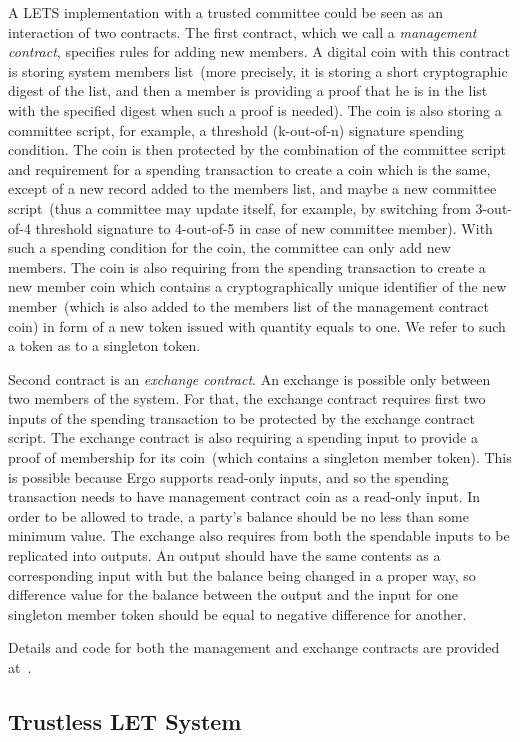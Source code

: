\documentclass[]{llncs}   %
\begin{document}
A LETS implementation with a trusted committee could be seen as an interaction of two contracts. The first contract, which we
call a {\em management contract}, specifies rules for adding new members. A digital coin with this contract is storing system members list~(more precisely, it is storing a short cryptographic digest of the list, and then a member is providing a proof that he is in the list with the specified digest when such a proof is needed). The coin is also storing a committee script, for example, a threshold (k-out-of-n) signature spending condition. The coin is then protected by the combination of the committee script and requirement for a 
spending transaction to create a coin which is the same, except of a new record added to the members list, and maybe a new committee script~(thus a committee may update itself, for example, by switching from 3-out-of-4 threshold signature to 4-out-of-5 in case of new committee member). With such a spending condition for the coin, the committee can only add new members. The coin is also requiring from the spending transaction to create a new member coin which contains a cryptographically unique identifier of the new member~(which is also added to the members list of the management contract coin) in form of a new token issued with quantity equals to one. We 
refer to such a token as to a singleton token.

Second contract is an {\em exchange contract}. An exchange is possible only between two members of the system. For that, the exchange 
contract requires first two inputs of the spending transaction to be protected by the exchange contract script. The exchange contract is also 
requiring a spending input to provide a proof of membership for its coin~(which contains a singleton member token). This is possible because Ergo supports read-only inputs, and so the spending transaction needs to have management contract coin as a read-only input. In order to be allowed to trade, a party's balance should be no less than some minimum value. The exchange also requires from both the spendable inputs to be replicated into outputs. An output should have the same contents as a corresponding input with but the balance being changed in a proper way, so difference value for the balance between the output and the input for one singleton member token should be equal to negative difference for another.

Details and code for both the management and exchange contracts are provided at~\cite{lets-trusted}.


\subsection{Trustless LET System}
\label{sec-trustless}
\end{document}
